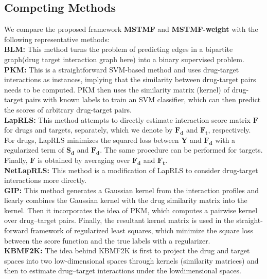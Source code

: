 \documentclass{article}
\begin{document}
\subsection{Competing Methods}
We compare the proposed framework \textbf{MSTMF} and \textbf{MSTMF-weight} with the following representative methods: \\
\textbf{BLM:} This method turns the problem of predicting edges in a bipartite graph(drug target interaction graph here) into a binary supervised problem.\cite{gonen2012predicting} \\
\textbf{PKM:} This is a straightforward SVM-based method and uses drug-target interactions as instances, implying that the similarity between drug-target pairs needs to be computed. PKM then uses the similarity matrix (kernel) of drug-target pairs with known labels to train an SVM classifier, which can then predict the scores of arbitrary drug-target pairs.\cite{jacob2008protein}\\
\textbf{LapRLS:} This method attempts to directly estimate interaction score matrix $\bm{F}$ for drugs and targets, separately, which we denote by $\bm{F_d}$ and $\bm{F_t}$, respectively. For drugs, LapRLS minimizes the squared loss between $\bm{Y}$ and $\bm{F_d}$ with a regularized term of $\bm{S_d}$ and $\bm{F_d}$. The same procedure can be performed for targets. Finally, $\bm{F}$ is obtained by averaging over $\bm{F_d}$ and $\bm{F_t}$. \cite{xia2010semi} \\
\textbf{NetLapRLS:} This method is a modification of LapRLS to consider drug-target interactions more directly.\\
\textbf{GIP:} This method generates a Gaussian kernel from the interaction profiles and liearly combines the Gaussian kernel with the drug similarity matrix into the kernel. Then it incorporates the idea of PKM, which computes a pairwise kernel over drug–target pairs. Finally, the resultant kernel matrix is used in the straight-forward framework of regularized least
squares, which minimize the square loss between the score function and the true labels with a regularizer.\cite{vanLaarhoven2011}\\
\textbf{KBMF2K:} The idea behind KBMF2K is first to project the drug and target spaces into two low-dimensional spaces
through kernels (similarity matrices) and then to estimate drug–target interactions under the lowdimensional spaces. \cite{gonen2012predicting} \\
\end{document}
